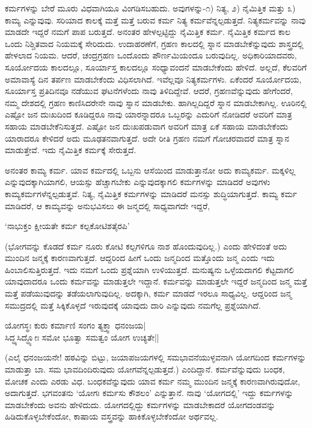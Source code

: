 ಕರ್ಮಗಳನ್ನು ಬೇರೆ ಮೂರು ವಿಧವಾಗಿಯೂ ವಿಂಗಡಿಸಬಹುದು. ಅವುಗಳನ್ನು-೧) ನಿತ್ಯ, ೨) ನೈಮಿತ್ತಿಕ ಮತ್ತು ೩) ಕಾಮ್ಯ ಎನ್ನುವುವು. ಸರಿಯಾದ ಕಾಲಕ್ಕೆ ಮತ್ತೆ ಮತ್ತೆ ಬರುವ ಕರ್ಮ ನಿತ್ಯ ಕರ್ಮವೆನ್ನಲ್ಪಡುತ್ತದೆ. ನಿತ್ಯಕರ್ಮವನ್ನು ನಾವು ಮಾಡದೇ ಇದ್ದರೆ ನಮಗೆ ಪಾಪ ಬರುತ್ತದೆ. ಅನಂತರ ಹೇಳಲ್ಪಟ್ಟಿದ್ದು ನೈಮಿತ್ತಿಕ ಕರ್ಮ. ನೈಮಿತ್ತಿಕ ಕರ್ಮದ ಕಾಲ ಒಂದು ನಿಶ್ಚಿತವಾದ ನಿಯಮಕ್ಕೆ ಸೇರಿದುದು. ಉದಾಹರಣೆಗೆ, ಗ್ರಹಣ ಕಾಲದಲ್ಲಿ ಸ್ನಾನ ಮಾಡಬೇಕೆನ್ನುವುದು ಶಾಸ್ತ್ರದಲ್ಲಿ ಹೇಳಲಾದ ನಿಯಮ. ಆದರೆ, ಚಂದ್ರಗ್ರಹಣ ಒಂದೊಂದು ಪೌರ್ಣಮಿಯಂದೂ ಬರುವುದಿಲ್ಲ. ಅಧಿಕಾರಿಯಾದವರು, ಸೂರ್ಯೋದಯ ಕಾಲದಲ್ಲೂ, ಸೂರ್ಯಾಸ್ತ ಕಾಲದಲ್ಲೂ ಸಂಧ್ಯಾವಂದನೆ ಮಾಡಬೇಕೆಂದು ಹೇಳಿದೆ. ಅಲ್ಲದೆ, ಕೆಲವರಿಗೆ ಅಮಾವಾಸ್ಯೆ ದಿನ ತರ್ಪಣ ಮಾಡಬೇಕೆಂದು ವಿಧಿಸಲಾಗಿದೆ. ಇವೆಲ್ಲವೂ ನಿತ್ಯಕರ್ಮಗಳು. ಏಕೆಂದರೆ ಸೂರ್ಯೋದಯ, ಸೂರ್ಯಾಸ್ತ ಪ್ರತಿದಿನವೂ ನಡೆಯುವ ಘಟನೆಗಳೆಂದು ನಾವು ತಿಳಿದಿದ್ದೇವೆ. ಆದರೆ, ಗ್ರಹಣವೆನ್ನುವುದು ಹೇಗೆಂದರೆ, ನಮ್ಮ ದೇಶದಲ್ಲಿ ಗ್ರಹಣ ಕಾಣಿಸಿದರೇನೇ ನಾವು ಸ್ನಾನ ಮಾಡಬೇಕು. ಹಾಗಿಲ್ಲದಿದ್ದರೆ ಸ್ನಾನ ಮಾಡಬೇಕಾಗಿಲ್ಲ. ಊರಿನಲ್ಲಿ ಎಷ್ಟೋ ಜನ ದುಃಖದಿಂದ ಕೂಡಿದ್ದರೂ ನಾವು ಯಾರನ್ನಾದರೂ ಒಬ್ಬರನ್ನು ಎದುರಿಗೆ ನೋಡಿದರೆ ಅವರಿಗೆ ಮಾತ್ರ ಸಹಾಯ ಮಾಡಬೇಕೆನಿಸುತ್ತದೆ. ಎಷ್ಟೋ ಜನ ದುಃಖಪಡುವಾಗ ಅವರಿಗೆ ಮಾತ್ರ ಏಕೆ ಸಹಾಯ ಮಾಡಬೇಕೆಂದು ಯಾರಾದರೂ ಕೇಳಿದರೆ ಅದು ಮೂಢತನವಾಗುತ್ತದೆ. ಅದೇ ರೀತಿ ಗ್ರಹಣ ನಮಗೆ ಗೋಚರವಾದರೆ ಮಾತ್ರ ಸ್ನಾನ ಮಾಡುತ್ತೇವೆ. ಇದು ನೈಮಿತ್ತಿಕ ಕರ್ಮಕ್ಕೆ ಸೇರುತ್ತದೆ.

ಅನಂತರ ಕಾಮ್ಯ ಕರ್ಮ. ಯಾವ ಕರ್ಮದಲ್ಲಿ ಒಬ್ಬನು ಆಸೆಯಿಂದ ಮಾಡುತ್ತಾನೋ ಅದು ಕಾಮ್ಯಕರ್ಮ. ಮಕ್ಕಳಿಲ್ಲ ಎನ್ನುವುದಕ್ಕಾಗಿಯಾಗಲಿ, ಆಯಸ್ಸು ಹೆಚ್ಚಾಗಬೇಕು ಎನ್ನುವುದಕ್ಕಾಗಲಿ ಕರ್ಮಗಳನ್ನು ಮಾಡಿದರೆ ಅವುಗಳು ಕಾಮ್ಯಕರ್ಮಗಳೆನ್ನಲ್ಪಡುತ್ತವೆ. ನಿತ್ಯ, ನೈಮಿತ್ತಿಕ ಕರ್ಮಗಳನ್ನು ಮಾಡಿದರೆ ಮನಸ್ಸು ಶುದ್ಧಿಯಾಗುತ್ತದೆ. ಕಾಮ್ಯ ಕರ್ಮ ಮಾಡಿದರೆ, ಆ ಕಾಮ್ಯವನ್ನು ಅನುಭವಿಸಲು ಈ ಜನ್ಮದಲ್ಲಿ ಸಾಧ್ಯವಾಗದೇ ಇದ್ದರೆ,

\begin{shloka}
`ನಾಭುಕ್ತಂ ಕ್ಷೀಯತೇ ಕರ್ಮ ಕಲ್ಪಕೋಟಿಶತೈರಪಿ'
\end{shloka}

(ಭೋಗವನ್ನು ಕೊಡದೆ ಕರ್ಮ ನೂರು ಕೋಟಿ ಕಲ್ಪಗಳಿಗೂ ನಾಶ ಹೊಂದುವುದಿಲ್ಲ.) ಎಂದು ಹೇಳಿದಂತೆ ಅದು ಮುಂದಿನ ಜನ್ಮಕ್ಕೆ ಕಾರಣವಾಗುತ್ತದೆ. ಆದ್ದರಿಂದ ಹೀಗೆ ಒಂದು ಜನ್ಮದಿಂದ ಮತ್ತೊಂದು ಜನ್ಮ ಎಂದು ಇದು ಹಿಂಬಾಲಿಸುತ್ತಿರುತ್ತದೆ. ಇದು ನಮಗೆ ಒಂದು ಪ್ರಶ್ನೆಯಾಗಿ ಉಳಿಯುತ್ತದೆ. ಮನುಷ್ಯನು ಒಳ್ಳೆಯದಾಗಲಿ ಕೆಟ್ಟದಾಗಲಿ ಯಾವುದಾದರೂ ಒಂದು ಕರ್ಮವನ್ನು ಮಾಡುತ್ತಲೇ ಇದ್ದಾನೆ. ಕರ್ಮವನ್ನು ಮಾಡುತ್ತಲೇ ಇದ್ದರೆ ಜನ್ಮದಿಂದ ಜನ್ಮ ಮತ್ತೆ ಮತ್ತೆ ಪಡೆಯುವುದನ್ನು ತಡೆಯಲಾಗುವುದಿಲ್ಲ. ಅದಕ್ಕಾಗಿ, ಕರ್ಮ ಮಾಡದೆ ಇರಲೂ ಸಾಧ್ಯವಿಲ್ಲ. ಆದ್ದರಿಂದ ಜನ್ಮ ಸಮುದ್ರದಲ್ಲಿ ಮತ್ತೆ ಸಿಕ್ಕಿಕೊಳ್ಳದೆ ಇರುವುದಕ್ಕೆ ಯಾವುದು ದಾರಿ ಎನ್ನುವುದು ನಮಗೆಲ್ಲ ಪ್ರಶ್ನೆಯಾಗಿದೆ.

\begin{shloka}
ಯೋಗಸ್ಥಃ ಕುರು ಕರ್ಮಾಣಿ ಸಂಗಂ ತ್ಯಕ್ತ್ವಾ ಧನಂಜಯ|\\
ಸಿದ್ಧ್ಯಸಿದ್ಧ್ಯೋಃ ಸಮೋ ಭೂತ್ವಾ ಸಮತ್ವಂ ಯೋಗ ಉಚ್ಯತೇ||
\end{shloka}

(ಎಲೈ ಧನಂಜಯನೇ! ಹಠವಿನ್ನು ಬಿಟ್ಟು, ಜಯಾಪಜಯಗಳಲ್ಲಿ ಸಮಭಾವನೆಯುಳ್ಳವನಾಗಿ ಯೋಗದಿಂದ ಕರ್ಮಗಳನ್ನು ಮಾಡುತ್ತಾ ಬಾ. ಸಮ ಭಾವದಿಂದಿರುವುದು ಯೋಗವೆನ್ನಲ್ಪಡುತ್ತದೆ.) ಎಂದಿದ್ದಾನೆ. ಕರ್ಮವೆನ್ನುವುದು ಬಂಧಕ, ಮೋಚಕ ಎಂದು ಎರಡು ವಿಧ. ಬಂಧಕವೆನ್ನುವುದು ಯಾವ ಕರ್ಮ ನಮ್ಮ ಮುಂದಿನ ಜನ್ಮಕ್ಕೆ ಕಾರಣವಾಗಿರುವುದೋ, ಅದಾಗುತ್ತದೆ. ಭಗವಂತನು `ಯೋಗಃ ಕರ್ಮಸು ಕೌಶಲಂ' ಎನ್ನುತ್ತಾನೆ. ನಾವು `ಯೋಗದಲ್ಲಿ' ಇದ್ದು ಕರ್ಮಗಳನ್ನು ಮಾಡಬೇಕೆಂದು ಅವನು ಹೇಳಿದುದು. ಯೋಗದಲ್ಲಿದ್ದು ಕರ್ಮಗಳನ್ನು ಮಾಡಬೇಕಾದರೆ ಯೋಗದಂಡವನ್ನು ಹಿಡಿದುಕೊಳ್ಳಬೇಕೆಂದೋ, ಕಾಷಾಯ ವಸ್ತ್ರವನ್ನು ಹಾಕಿಕೊಳ್ಳಬೇಕೆಂದೋ ಅರ್ಥವಲ್ಲ.

